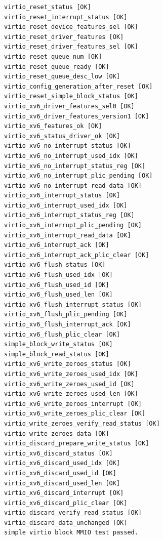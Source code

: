 \documentclass[UTF8,a4paper,11pt]{ctexart}
\begin{document}
\begin{Verbatim}[fontsize=\small]
virtio_reset_status [OK]
virtio_reset_interrupt_status [OK]
virtio_reset_device_features_sel [OK]
virtio_reset_driver_features [OK]
virtio_reset_driver_features_sel [OK]
virtio_reset_queue_num [OK]
virtio_reset_queue_ready [OK]
virtio_reset_queue_desc_low [OK]
virtio_config_generation_after_reset [OK]
virtio_reset_simple_block_status [OK]
virtio_xv6_driver_features_sel0 [OK]
virtio_xv6_driver_features_version1 [OK]
virtio_xv6_features_ok [OK]
virtio_xv6_status_driver_ok [OK]
virtio_xv6_no_interrupt_status [OK]
virtio_xv6_no_interrupt_used_idx [OK]
virtio_xv6_no_interrupt_status_reg [OK]
virtio_xv6_no_interrupt_plic_pending [OK]
virtio_xv6_no_interrupt_read_data [OK]
virtio_xv6_interrupt_status [OK]
virtio_xv6_interrupt_used_idx [OK]
virtio_xv6_interrupt_status_reg [OK]
virtio_xv6_interrupt_plic_pending [OK]
virtio_xv6_interrupt_read_data [OK]
virtio_xv6_interrupt_ack [OK]
virtio_xv6_interrupt_ack_plic_clear [OK]
virtio_xv6_flush_status [OK]
virtio_xv6_flush_used_idx [OK]
virtio_xv6_flush_used_id [OK]
virtio_xv6_flush_used_len [OK]
virtio_xv6_flush_interrupt_status [OK]
virtio_xv6_flush_plic_pending [OK]
virtio_xv6_flush_interrupt_ack [OK]
virtio_xv6_flush_plic_clear [OK]
simple_block_write_status [OK]
simple_block_read_status [OK]
virtio_xv6_write_zeroes_status [OK]
virtio_xv6_write_zeroes_used_idx [OK]
virtio_xv6_write_zeroes_used_id [OK]
virtio_xv6_write_zeroes_used_len [OK]
virtio_xv6_write_zeroes_interrupt [OK]
virtio_xv6_write_zeroes_plic_clear [OK]
virtio_write_zeroes_verify_read_status [OK]
virtio_write_zeroes_data [OK]
virtio_discard_prepare_write_status [OK]
virtio_xv6_discard_status [OK]
virtio_xv6_discard_used_idx [OK]
virtio_xv6_discard_used_id [OK]
virtio_xv6_discard_used_len [OK]
virtio_xv6_discard_interrupt [OK]
virtio_xv6_discard_plic_clear [OK]
virtio_discard_verify_read_status [OK]
virtio_discard_data_unchanged [OK]
simple virtio block MMIO test passed.
\end{Verbatim}
\end{document}
